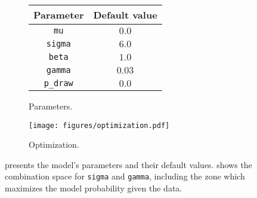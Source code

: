 \documentclass[article]{jss}
\begin{document}
\begin{figure}[ht!]
    \centering
    \begin{subfigure}[b]{0.32\textwidth}
        \begin{tabular}{cc}
        Parameter & Default value \\ \hline 
        \texttt{mu} & $0.0$ \\ \hline
        \texttt{sigma} & $6.0$ \\ \hline
        \texttt{beta} & $1.0$ \\ \hline
        \texttt{gamma} & $0.03$ \\ \hline
        \texttt{p\_draw} & $0.0$ \\ \hline
        \end{tabular}
    \vspace{0.5cm}
    \caption{Parameters.}
    \label{fig:default_values}
    \end{subfigure}
% 
    \begin{subfigure}[b]{0.32\textwidth}
      \centering
      \texttt{[image: figures/optimization.pdf]}
      \caption{Optimization.}
      \label{fig:optimization}
    \end{subfigure}
    \caption{ presents the model's parameters and their default values. 
     shows the combination space for \texttt{sigma} and \texttt{gamma}, including the zone which maximizes the model probability given the data.}
    \label{fig:parameters}
\end{figure}

%
%
\end{document}
